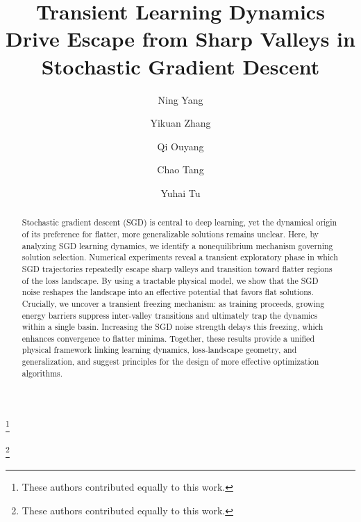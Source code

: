 \documentclass[aps,prx,reprint,superscriptaddress,longbibliography,nofootinbib,floatfix]{revtex4-2}
\begin{document}

\title{Transient Learning Dynamics Drive Escape from Sharp Valleys in Stochastic Gradient Descent}

\author{Ning Yang}
\thanks{These authors contributed equally to this work.}

\author{Yikuan Zhang}
\thanks{These authors contributed equally to this work.}

\author{Qi Ouyang}

\author{Chao Tang}

\author{Yuhai Tu}

\begin{abstract}
Stochastic gradient descent (SGD) is central to deep learning, yet the dynamical origin of its preference for flatter, more generalizable solutions remains unclear. Here, by analyzing SGD learning dynamics, we identify a nonequilibrium mechanism governing solution selection. Numerical experiments reveal a transient exploratory phase in which SGD trajectories repeatedly escape sharp valleys and transition toward flatter regions of the loss landscape. By using a tractable physical model, we show that the SGD noise reshapes the landscape into an effective potential that favors flat solutions. Crucially, we uncover a transient freezing mechanism: as training proceeds, growing energy barriers suppress inter-valley transitions and ultimately trap the dynamics within a single basin. Increasing the SGD noise strength delays this freezing, which enhances convergence to flatter minima. Together, these results provide a unified physical framework linking learning dynamics, loss-landscape geometry, and generalization, and suggest principles for the design of more effective optimization algorithms.
\end{abstract}
\end{document}
